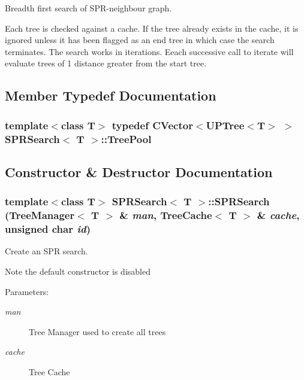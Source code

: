 Breadth first search of SPR-neighbour graph. 

Each tree is checked against a cache. If the tree already exists in the cache, it is ignored unless it has been flagged as an end tree in which case the search terminates. The search works in iterations. Eeach successive call to iterate will evaluate trees of 1 distance greater from the start tree. 



\subsection{Member Typedef Documentation}
\subsubsection{\setlength{\rightskip}{0pt plus 5cm}template$<$class T$>$ typedef {\bf CVector}$<${\bf UPTree}$<$T$>$ $>$ {\bf SPRSearch}$<$ T $>$::{\bf Tree\-Pool}}\label{classSPRSearch_w0}




\subsection{Constructor \& Destructor Documentation}
\subsubsection{\setlength{\rightskip}{0pt plus 5cm}template$<$class T$>$ {\bf SPRSearch}$<$ T $>$::{\bf SPRSearch} ({\bf Tree\-Manager}$<$ T $>$ \& {\em man}, {\bf Tree\-Cache}$<$ T $>$ \& {\em cache}, unsigned char {\em id})}\label{classSPRSearch_a0}


Create an SPR search. 

Note the default constructor is disabled \begin{Desc}
\item[Parameters:]
\begin{description}
\item[{\em man}]Tree Manager used to create all trees \item[{\em cache}]Tree Cache \end{description}
\end{Desc}

